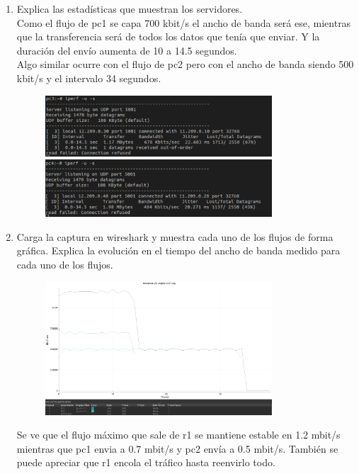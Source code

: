 \documentclass[12pt, a4paper]{report}
\begin{document}
\begin{enumerate}
	\item Explica las estadísticas que muestran los servidores.\\
	
	Como el flujo de pc1 se capa 700 kbit/s el ancho de banda será ese, mientras que la transferencia será de todos los datos que tenía que enviar. Y la duración del envío aumenta de 10 a 14.5 segundos.\\
	
	Algo similar ocurre con el flujo de pc2 pero con el ancho de banda siendo 500 kbit/s y el intervalo 34 segundos.
	\begin{figure}[H]
		\centering
		\includegraphics[width=0.8\textwidth]{ej1.3.3_1_a}
		\includegraphics[width=0.8\textwidth]{ej1.3.3_1_b}
	\end{figure}
	\item Carga la captura en wireshark y muestra cada uno de los flujos de forma gráfica. Explica la
	evolución en el tiempo del ancho de banda medido para cada uno de los flujos.
	\begin{figure}[H]
		\centering
		\includegraphics[width=0.8\textwidth]{ej1.3.3_2}
	\end{figure}
	Se ve que el flujo máximo que sale de r1 se mantiene estable en 1.2 mbit/s mientras que pc1 envia a 0.7 mbit/s y pc2 envía a 0.5 mbit/s. También se puede apreciar que r1 encola el tráfico hasta reenvirlo todo.
\end{enumerate}
\end{document}
